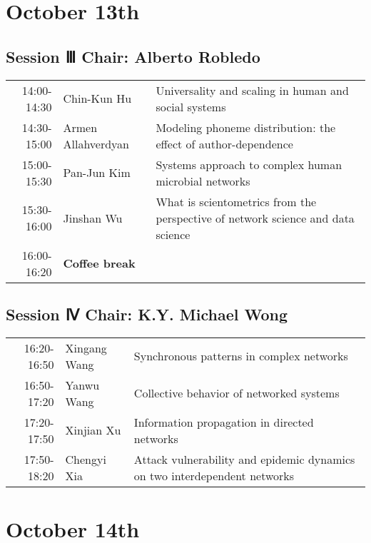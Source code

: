\documentclass[11pt]{article}
\begin{document}
\newpage

\section*{October 13th}
\label{sec:org633757b}

\subsection*{Session Ⅲ Chair: Alberto Robledo}
\label{sec:org001e2ae}

\begin{center}
\begin{tabular}{rll}
\hline
14:00-14:30 & Chin-Kun Hu & Universality and scaling in human and social systems\\
14:30-15:00 & Armen Allahverdyan & Modeling phoneme distribution: the effect of author-dependence\\
15:00-15:30 & Pan-Jun Kim & Systems approach to complex human microbial networks\\
15:30-16:00 & Jinshan Wu & What is scientometrics from the perspective of network science and data science\\
16:00-16:20 &  \textbf{Coffee break} & \\
\hline
\end{tabular}
\end{center}

\subsection*{Session Ⅳ Chair: K.Y. Michael Wong}
\label{sec:org6070b63}

\begin{center}
\begin{tabular}{rll}
\hline
16:20-16:50 & Xingang Wang & Synchronous patterns in complex networks\\
16:50-17:20 & Yanwu Wang & Collective behavior of networked systems\\
17:20-17:50 & Xinjian Xu & Information propagation in directed networks\\
17:50-18:20 & Chengyi Xia & Attack vulnerability and epidemic dynamics on two interdependent networks\\
\hline
\end{tabular}
\end{center}

\newpage

\section*{October 14th}
\label{sec:orgcccf76d}
\end{document}
